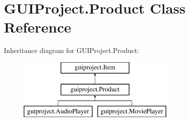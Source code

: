 \hypertarget{class_g_u_i_project_1_1_product}{}\section{G\+U\+I\+Project.\+Product Class Reference}
\label{class_g_u_i_project_1_1_product}
Inheritance diagram for G\+U\+I\+Project.\+Product\+:\begin{figure}[H]
\begin{center}
\leavevmode
\includegraphics[height=3.000000cm]{class_g_u_i_project_1_1_product}
\end{center}
\end{figure}
